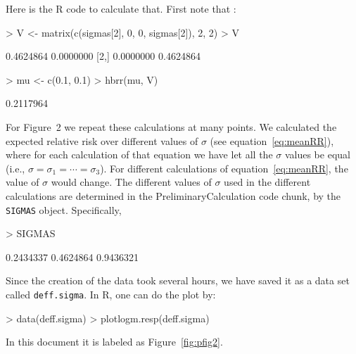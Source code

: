 \documentclass{article}[12pt]
\begin{document}
Here is the R code to calculate that. First note that :
\begin{Schunk}
\begin{Sinput}
> V <- matrix(c(sigmas[2], 0, 0, sigmas[2]), 2, 2)
> V
\end{Sinput}
\begin{Soutput}
          [,1]      [,2]
[1,] 0.4624864 0.0000000
[2,] 0.0000000 0.4624864
\end{Soutput}
\begin{Sinput}
> mu <- c(0.1, 0.1)
> hbrr(mu, V)
\end{Sinput}
\begin{Soutput}
[1] 0.2117964
\end{Soutput}
\end{Schunk}

For Figure~2 we repeat these calculations at many points.
We calculated the expected relative risk over different values of $\sigma$ (see equation~\ref{eq:meanRR}), 
where for each calculation of that equation we have let all the $\sigma$ values be equal (i.e., $\sigma=\sigma_1=\cdots = \sigma_3$). 
For different calculations of equation~\ref{eq:meanRR}, the value of $\sigma$ would change. 
The different values of $\sigma$ used in the different calculations 
are determined in the PreliminaryCalculation code chunk, by the \texttt{SIGMAS} object.
Specifically, 
\begin{Schunk}
\begin{Sinput}
> SIGMAS
\end{Sinput}
\begin{Soutput}
[1] 0.2434337 0.4624864 0.9436321
\end{Soutput}
\end{Schunk}
Since the creation of the data took several hours, we have saved it as a data set called \texttt{deff.sigma}.
In R, one can do the plot by: 
\begin{Schunk}
\begin{Sinput}
> data(deff.sigma)
> plotlogm.resp(deff.sigma)
\end{Sinput}
\end{Schunk}
In this document it is labeled as Figure~\ref{fig:pfig2}.
\end{document}
